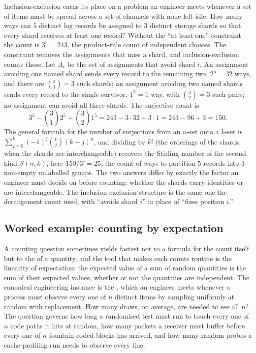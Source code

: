 Inclusion-exclusion earns its place on a problem an engineer meets
whenever a set of items must be spread across a set of channels with
none left idle. How many ways can $5$ distinct log records be
assigned to $3$ distinct storage shards so that every shard receives
at least one record? Without the ``at least one'' constraint the
count is $3^{5} = 243$, the product-rule count of independent
choices. The constraint removes the assignments that miss a shard,
and inclusion-exclusion counts those. Let $A_{i}$ be the set of
assignments that avoid shard $i$. An assignment avoiding one named
shard sends every record to the remaining two, $2^{5} = 32$ ways, and
there are $\binom{3}{1} = 3$ such shards; an assignment avoiding two
named shards sends every record to the single survivor, $1^{5} = 1$
way, with $\binom{3}{2} = 3$ such pairs; no assignment can avoid all
three shards. The surjective count is
\[
3^{5} - \binom{3}{1} 2^{5} + \binom{3}{2} 1^{5}
= 243 - 3 \cdot 32 + 3 \cdot 1 = 243 - 96 + 3 = 150.
\]
The general formula for the number of surjections from an $n$-set
onto a $k$-set is $\sum_{j=0}^{k} (-1)^{j} \binom{k}{j} (k - j)^{n}$,
and dividing by $k!$ (the orderings of the shards, when the shards
are interchangeable) recovers the Stirling number of the second kind
$S(n, k)$, here $150 / 3! = 25$, the count of ways to partition $5$
records into $3$ non-empty unlabelled groups. The two answers differ
by exactly the factor an engineer must decide on before counting:
whether the shards carry identities or are interchangeable. The
inclusion-exclusion structure is the same one the derangement count
used, with ``avoids shard $i$'' in place of ``fixes position $i$.''

\subsection{Worked example: counting by expectation}

A counting question sometimes yields fastest not to a formula for the
count itself but to the  of a quantity, and the
tool that makes such counts routine is the linearity of expectation:
the expected value of a sum of random quantities is the sum of their
expected values, whether or not the quantities are independent. The
canonical engineering instance is the , which an engineer meets whenever a process must observe every
one of $n$ distinct items by sampling uniformly at random with
replacement. How many draws, on average, are needed to see all $n$? The
question governs how long a randomised test must run to touch every one
of $n$ code paths it hits at random, how many packets a receiver must
buffer before every one of $n$ fountain-coded blocks has arrived, and
how many random probes a cache-profiling run needs to observe every
line.

